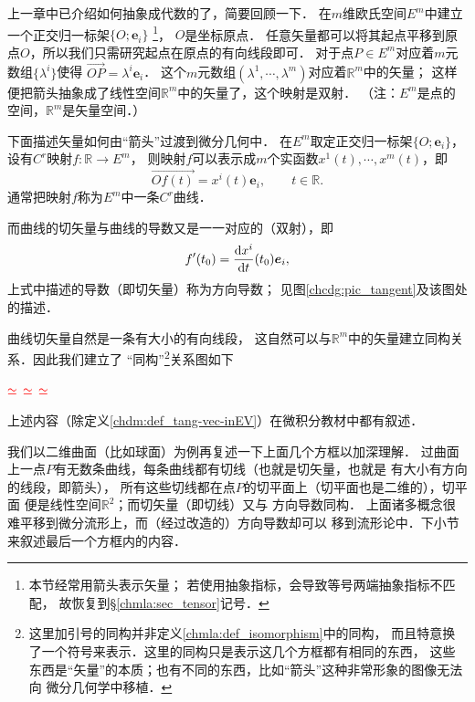 上一章中已介绍如何抽象成代数的了，简要回顾一下．
在$m$维欧氏空间$E^m$中建立一个正交归一标架$\{O;\boldsymbol{e}_i\}$
{\footnote{本节经常用箭头表示矢量；
        若使用抽象指标，会导致等号两端抽象指标不匹配，
    故恢复到\S\ref{chmla:sec_tensor}记号．}}，
$O$是坐标原点．
任意矢量都可以将其起点平移到原点$O$，所以我们只需研究起点在原点的有向线段即可．
对于点$P \in E^m$对应着$m$元数组$\{\lambda^i\}$使得
$    \overrightarrow{OP} = \lambda^i \boldsymbol{e}_i $．
这个$m$元数组$(\lambda^1,\cdots,\lambda^m)$对应着$\mathbb{R}^m$中的矢量；
这样便把箭头抽象成了线性空间$\mathbb{R}^m$中的矢量了，这个映射是双射．
（注：$E^m$是{\kaishu 点}的空间，$\mathbb{R}^m$是{\kaishu 矢量}空间．）

下面描述矢量如何由“箭头”过渡到微分几何中．
在$E^m$取定正交归一标架$\{O;\boldsymbol{e}_i\}$，设有$C^r$映射$f:\mathbb{R} \to E^m$，
则映射$f$可以表示成$m$个实函数$x^1(t),\cdots, x^m(t)$，即
\begin{equation}
    \overrightarrow{Of(t)} = x^i(t) \boldsymbol{e}_i , \qquad t\in \mathbb{R} .
\end{equation}
通常把映射$f$称为$E^m$中一条$C^r${\kaishu 曲线}．

而曲线的切矢量与曲线的导数又是一一对应的（双射），即
\begin{equation}\label{chdm:eqn_gfv}
    f'(t_0) = \frac{{\rm d} x^i}{{\rm d}t}(t_0)\boldsymbol{e}_i ,
\end{equation}
上式中描述的导数（即切矢量）称为{\kaishu 方向导数}；
见图\ref{chcdg:pic_tangent}及该图处的描述．

曲线切矢量自然是一条有大小的有向线段，
这自然可以与$\mathbb{R}^m$中的矢量建立同构关系．因此我们建立了
“同构”{\footnote{这里加引号的同构并非定义\ref{chmla:def_isomorphism}中的同构，
        而且特意换了一个符号来表示．这里的同构只是表示这几个方框都有相同的东西，
        这些东西是“矢量”的本质；也有不同的东西，比如“箭头”这种非常形象的图像无法向
        微分几何学中移植．}}关系图如下
\begin{center}
     $\color{red}\simeq$
     $\color{red}\simeq$
     $\color{red}\simeq$
\end{center}
上述内容（除定义\ref{chdm:def_tang-vec-inEV}）在微积分教材中都有叙述．

我们以二维曲面（比如球面）为例再复述一下上面几个方框以加深理解．
过曲面上一点$P$有无数条曲线，每条曲线都有切线（也就是切矢量，也就是
有大小有方向的线段，即箭头），
所有这些切线都在点$P$的切平面上（切平面也是二维的），切平面
便是线性空间$\mathbb{R}^2$；而切矢量（即切线）又与
方向导数同构．
上面诸多概念很难平移到微分流形上，而（经过改造的）方向导数却可以
移到流形论中．下小节来叙述最后一个方框内的内容．


